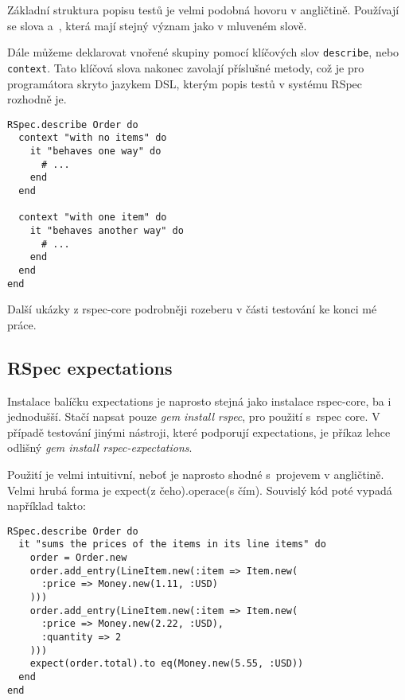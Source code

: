 \par Základní struktura popisu testů je velmi podobná hovoru v angličtině. Používají se slova  a~, která mají stejný význam jako v mluveném slově.

\par Dále můžeme deklarovat vnořené skupiny pomocí klíčových slov \texttt{describe}, nebo \texttt{context}. Tato klíčová slova nakonec zavolají příslušné metody, což je pro programátora skryto jazykem DSL, kterým popis testů v systému RSpec rozhodně je.
\begin{verbatim}
RSpec.describe Order do
  context "with no items" do
    it "behaves one way" do
      # ...
    end
  end

  context "with one item" do
    it "behaves another way" do
      # ...
    end
  end
end
\end{verbatim}
Další ukázky z rspec-core podrobněji rozeberu v části testování ke konci mé práce.

\subsection{RSpec expectations}
\par Instalace balíčku expectations je naprosto stejná jako instalace rspec-core, ba i jednodušší. Stačí napsat pouze \textit{gem install rspec}, pro použití s~rspec core. V případě testování jinými nástroji, které podporují expectations, je příkaz lehce odlišný \textit{gem install rspec-expectations}.


\par Použití je velmi intuitivní, neboť je naprosto shodné s~projevem v angličtině. Velmi hrubá forma je expect(z čeho).operace(s čím). Souvislý kód poté vypadá například takto:
\begin{verbatim}
RSpec.describe Order do
  it "sums the prices of the items in its line items" do
    order = Order.new
    order.add_entry(LineItem.new(:item => Item.new(
      :price => Money.new(1.11, :USD)
    )))
    order.add_entry(LineItem.new(:item => Item.new(
      :price => Money.new(2.22, :USD),
      :quantity => 2
    )))
    expect(order.total).to eq(Money.new(5.55, :USD))
  end
end
\end{verbatim}


